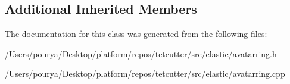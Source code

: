 \subsection*{Additional Inherited Members}


The documentation for this class was generated from the following files\+:\begin{DoxyCompactItemize}
\item 
/\+Users/pourya/\+Desktop/platform/repos/tetcutter/src/elastic/avatarring.\+h\item 
/\+Users/pourya/\+Desktop/platform/repos/tetcutter/src/elastic/avatarring.\+cpp\end{DoxyCompactItemize}
